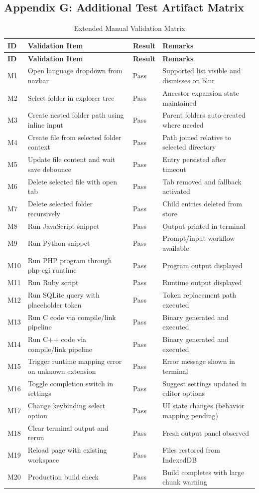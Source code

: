 \subsection*{Appendix G: Additional Test Artifact Matrix}
\begin{longtable}{p{1.0cm}p{4.5cm}p{3.5cm}p{4.0cm}}
\caption{Extended Manual Validation Matrix}\\
\toprule
\textbf{ID} & \textbf{Validation Item} & \textbf{Result} & \textbf{Remarks} \\
\midrule
\endfirsthead
\toprule
\textbf{ID} & \textbf{Validation Item} & \textbf{Result} & \textbf{Remarks} \\
\midrule
\endhead
M1 & Open language dropdown from navbar & Pass & Supported list visible and dismisses on blur \\
M2 & Select folder in explorer tree & Pass & Ancestor expansion state maintained \\
M3 & Create nested folder path using inline input & Pass & Parent folders auto-created where needed \\
M4 & Create file from selected folder context & Pass & Path joined relative to selected directory \\
M5 & Update file content and wait save debounce & Pass & Entry persisted after timeout \\
M6 & Delete selected file with open tab & Pass & Tab removed and fallback activated \\
M7 & Delete selected folder recursively & Pass & Child entries deleted from store \\
M8 & Run JavaScript snippet & Pass & Output printed in terminal \\
M9 & Run Python snippet & Pass & Prompt/input workflow available \\
M10 & Run PHP program through php-cgi runtime & Pass & Program output displayed \\
M11 & Run Ruby script & Pass & Runtime output displayed \\
M12 & Run SQLite query with placeholder token & Pass & Token replacement path executed \\
M13 & Run C code via compile/link pipeline & Pass & Binary generated and executed \\
M14 & Run C++ code via compile/link pipeline & Pass & Binary generated and executed \\
M15 & Trigger runtime mapping error on unknown extension & Pass & Error message shown in terminal \\
M16 & Toggle completion switch in settings & Pass & Suggest settings updated in editor options \\
M17 & Change keybinding select option & Pass & UI state changes (behavior mapping pending) \\
M18 & Clear terminal output and rerun & Pass & Fresh output panel observed \\
M19 & Reload page with existing workspace & Pass & Files restored from IndexedDB \\
M20 & Production build check & Pass & Build completes with large chunk warning \\
\bottomrule
\end{longtable}

